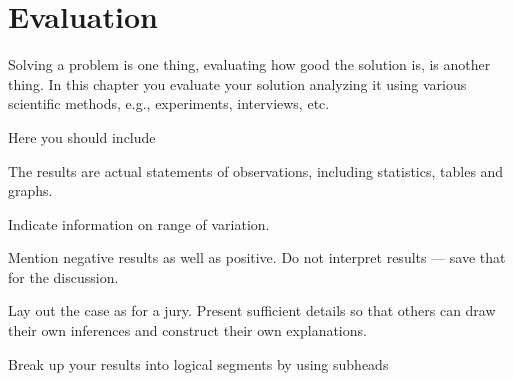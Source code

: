 \chapter{Evaluation}
\label{ch:evaluation}

Solving a problem is one thing, evaluating how good the solution is, is another
thing. In this chapter you evaluate your solution analyzing it using various
scientific methods, e.g., experiments, interviews, etc.

Here you should include

\begin{tight_enumerate}
    \item The results are actual statements of observations, including statistics, tables and graphs.
    \item Indicate information on range of variation.
    \item Mention negative results as well as positive. Do not interpret results --- save that for the discussion.
    \item Lay out the case as for a jury. Present sufficient details so that others can draw their own inferences and construct their own explanations.
    \item Break up your results into logical segments by using subheads
\end{tight_enumerate}
